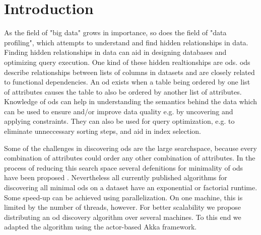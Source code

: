 
\section{Introduction}\label{sec:intro}
As the field of "big data" grows in importance, so does the field of "data profiling", which attempts to understand and find hidden relationships in data.
Finding hidden relationships in data can aid in designing databases and optimizing query execution.
One kind of these hidden realtionships are \glspl{od}. 
\glspl{od} describe relationships between lists of columns in datasets and are closely related to functional dependencies. 
An \gls{od} exists when a table being ordered by one list of attributes causes the table to also be ordered by another list of attributes.
Knowledge of \glspl{od} can help in understanding the semantics behind the data which can be used to ensure and/or improve data quality e.g. by uncovering and applying constraints.
They can also be used for query optimization, e.g. to eliminate unneccessary sorting steps, and aid in index selection.

Some of the challenges in discovering \glspl{od} are the large searchspace, because every combination of attributes could order any other combination of attributes. 
In the process of reducing this search space several defenitions for minimality of \glspl{od} have been proposed \cite{langer}\cite{szlichta:discovery}. 
Nevertheless all currently published algorithms for discovering all minimal \glspl{od} on a dataset have an exponential or factorial runtime. 
Some speed-up can be achieved using parallelization. 
On one machine, this is limited by the number of threads, however.
For better scalability we propose distributing an \gls{od} discovery algorithm over several machines.
To this end we adapted the algorithm \ocddiscover{} using the actor-based Akka framework.

